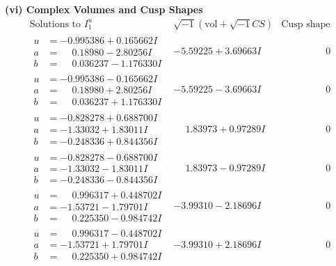 \documentclass[1p]{elsarticle_modified}
\theoremstyle{definition}
\newcommand{\I}{\sqrt{-1}}
\begin{document}
\newpage\flushleft \textbf{(vi) Complex Volumes and Cusp Shapes}
$$\begin{array}{c|c|c}  
\text{Solutions to }I^u_{1}& \I (\text{vol} + \sqrt{-1}CS) & \text{Cusp shape}\\
 \hline 
\begin{aligned}
u &= -0.995386 + 0.165662 I \\
a &= \phantom{-}0.18980 - 2.80256 I \\
b &= \phantom{-}0.036237 - 1.176330 I\end{aligned}
 & -5.59225 + 3.69663 I & \phantom{-0.000000 } 0 \\ \hline\begin{aligned}
u &= -0.995386 - 0.165662 I \\
a &= \phantom{-}0.18980 + 2.80256 I \\
b &= \phantom{-}0.036237 + 1.176330 I\end{aligned}
 & -5.59225 - 3.69663 I & \phantom{-0.000000 } 0 \\ \hline\begin{aligned}
u &= -0.828278 + 0.688700 I \\
a &= -1.33032 + 1.83011 I \\
b &= -0.248336 + 0.844356 I\end{aligned}
 & \phantom{-}1.83973 + 0.97289 I & \phantom{-0.000000 } 0 \\ \hline\begin{aligned}
u &= -0.828278 - 0.688700 I \\
a &= -1.33032 - 1.83011 I \\
b &= -0.248336 - 0.844356 I\end{aligned}
 & \phantom{-}1.83973 - 0.97289 I & \phantom{-0.000000 } 0 \\ \hline\begin{aligned}
u &= \phantom{-}0.996317 + 0.448702 I \\
a &= -1.53721 - 1.79701 I \\
b &= \phantom{-}0.225350 - 0.984742 I\end{aligned}
 & -3.99310 - 2.18696 I & \phantom{-0.000000 } 0 \\ \hline\begin{aligned}
u &= \phantom{-}0.996317 - 0.448702 I \\
a &= -1.53721 + 1.79701 I \\
b &= \phantom{-}0.225350 + 0.984742 I\end{aligned}
 & -3.99310 + 2.18696 I & \phantom{-0.000000 } 0 \\ \hline\begin{aligned}

\end{aligned}
\end{array}$$
\end{document}

